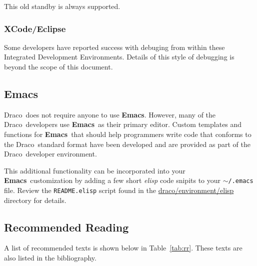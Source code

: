 \documentclass[11pt]{nmemo}
\newcommand{\comp}[1]{\normalfont\footnotesize\texttt{#1}\normalsize}
\newcommand{\draco}{{\normalfont\sffamily Draco}}
\newcommand{\emacs}{{\normalfont\bfseries Emacs}}
\newcommand{\bash}{{\normalfont\bfseries Bash}}
\begin{document}
This old standby is always supported.

\subsubsection{XCode/Eclipse}

Some developers have reported success with debuging from within these
Integrated Development Environments.  Details of this style of
debugging is beyond the scope of this document.

\subsection{\emacs}

\draco\ does not require anyone to use \emacs.  However, many of the
\draco\ developers use \emacs\ as their primary editor.  Custom
templates and functions for \emacs\ that should help programmers write
code that conforms to the \draco\ standard format have been developed
and are provided as part of the \draco\ developer environment.

This additional functionality can be incorporated into your \emacs\ 
customization by adding a few short \emph{elisp} code snipits to your
\comp{$\sim$/.emacs} file. Review the \comp{README.elisp} script
found in the \url{draco/environment/elisp} directory for details.





\subsection{Recommended Reading}

A list of recommended texts is shown below in Table~\ref{tab:rr}.
These texts are also listed in the bibliography.
\end{document}
